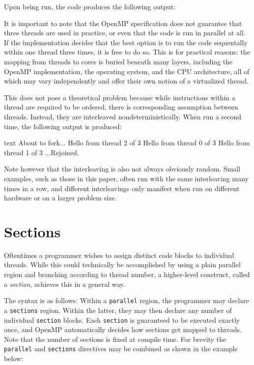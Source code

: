 \documentclass[conference, a4paper]{IEEEtran-modified}
\begin{document}
    Upon being run, the code produces the following output:



    It is important to note that the OpenMP specification does not guarantee that three threads are used in practice, or even that the code is run in parallel at all. If the implementation decides that the best option is to run the code sequentally within one thread three times, it is free to do so. This is for practical reasons: the mapping from threads to cores is buried beneath many layers, including the OpenMP implementation, the operating system, and the CPU architecture, all of which may vary independently and offer their own notion of a virtualized thread.

    This does not pose a theoretical problem because while instructions within a thread are required to be ordered, there is corresponding assumption between threads. Instead, they are interleaved nondeterministically. When run a second time, the following output is produced: 

      \begin{ccode}[]
        {text}
        About to fork...
        Hello from thread 2 of 3
        Hello from thread 0 of 3
        Hello from thread 1 of 3
        ...Rejoined.
      \end{ccode}

    Note however that the interleaving is also not always obviously random. Small examples, such as those in this paper, often run with the same interleaving many times in a row, and different interleavings only manifest when run on different hardware or on a larger problem size.


\section{Sections}


Oftentimes a programmer wishes to assign distinct code blocks to individual threads. While this could technically be accomplished by using a plain parallel region and branching according to thread number, a higher-level construct, called a \emph{section}, achieves this in a general way. 

The syntax is as follows: Within a \texttt{parallel} region, the programmer may declare a \texttt{sections} region. Within the latter, they may then declare any number of individual \texttt{section} blocks. Each \texttt{section} is guaranteed to be executed exactly once, and OpenMP automatically decides how sections get mapped to threads. Note that the number of sections is fixed at compile time. For brevity the \texttt{parallel} and \texttt{sections} directives may be combined as shown in the example below: 
\end{document}
